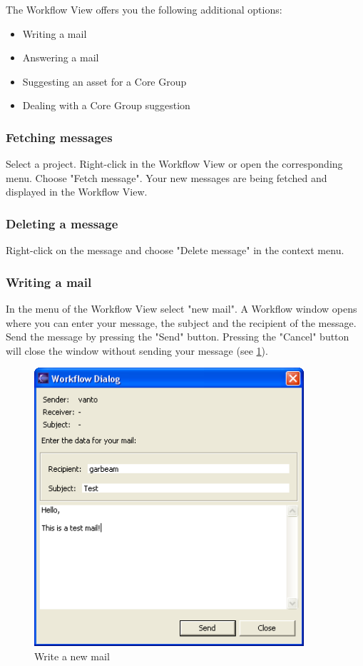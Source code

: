 The Workflow View offers you the following additional options:
\begin{itemize}
	\item Writing a mail
	\item Answering a mail
	\item Suggesting an asset for a Core Group
	\item Dealing with a Core Group suggestion
\end{itemize}


\subsubsection {Fetching messages}

Select a project. Right-click in the Workflow View or open the corresponding menu. Choose "Fetch message".
Your new messages are being fetched and displayed in the Workflow View.


\subsubsection{Deleting a message}

Right-click on the message and choose "Delete message" in the context menu.


\subsubsection{Writing a mail}

In the menu of the Workflow View select "new mail". A Workflow window opens where
you can enter your message, the subject and the recipient of the message. Send the
message by pressing the "Send" button. Pressing the "Cancel" button will close the window
without sending your message (see \ref{writemail}).

\begin{figure}[h!]
\begin{center}
\includegraphics[width=10cm]{writemail.png}
   \caption{Write a new mail}
\label{writemail}
\end{center}
\end{figure}\par

